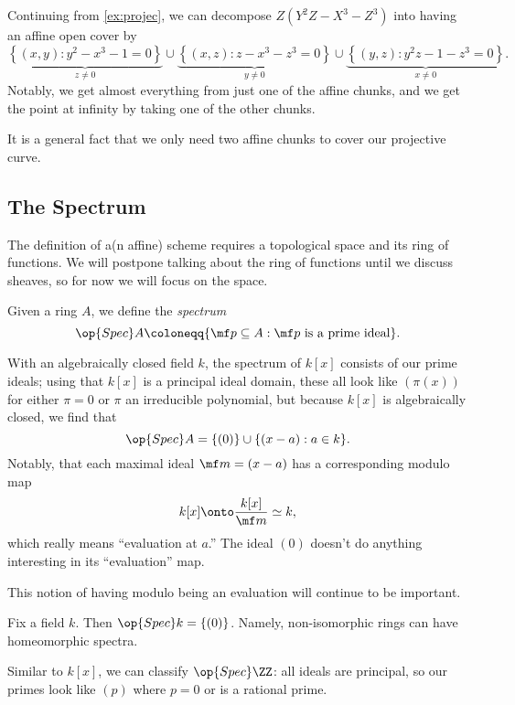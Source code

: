 \documentclass[../notes.tex]{subfiles}
\begin{document}
\begin{example}
	Continuing from \autoref{ex:projec}, we can decompose $Z\left(Y^2Z-X^3-Z^3\right)$ into having an affine open cover by
	\[\underbrace{\left\{(x,y):y^2-x^3-1=0\right\}}_{z\ne0}\cup\underbrace{\left\{(x,z):z-x^3-z^3=0\right\}}_{y\ne0}\cup\underbrace{\left\{(y,z):y^2z-1-z^3=0\right\}}_{x\ne0}.\]
	Notably, we get almost everything from just one of the affine chunks, and we get the point at infinity by taking one of the other chunks.
\end{example}
\begin{remark}
	It is a general fact that we only need two affine chunks to cover our projective curve.
\end{remark}

\subsection{The Spectrum}
The definition of a(n affine) scheme requires a topological space and its ring of functions. We will postpone talking about the ring of functions until we discuss sheaves, so for now we will focus on the space.
\begin{definition}[Spectrum]
	Given a ring $A$, we define the \textit{spectrum}
	\[\op{Spec}A\coloneqq\{\mf p\subseteq A:\mf p\text{ is a prime ideal}\}.\]
\end{definition}
\begin{example}
	With an algebraically closed field $k$, the spectrum of $k[x]$ consists of our prime ideals; using that $k[x]$ is a principal ideal domain, these all look like $(\pi(x))$ for either $\pi=0$ or $\pi$ an irreducible polynomial, but because $k[x]$ is algebraically closed, we find that
	\[\op{Spec}A=\{(0)\}\cup\{(x-a):a\in k\}.\]
	Notably, that each maximal ideal $\mf m=(x-a)$ has a corresponding modulo map
	\[k[x]\onto\frac{k[x]}{\mf m}\simeq k,\]
	which really means ``evaluation at $a$.'' The ideal $(0)$ doesn't do anything interesting in its ``evaluation'' map.
\end{example}
This notion of having modulo being an evaluation will continue to be important.
\begin{example}
	Fix a field $k$. Then $\op{Spec}k=\{(0)\}$. Namely, non-isomorphic rings can have homeomorphic spectra.
\end{example}
\begin{ex}
	Similar to $k[x]$, we can classify $\op{Spec}\ZZ$: all ideals are principal, so our primes look like $(p)$ where $p=0$ or is a rational prime.
\end{ex}
\end{document}
